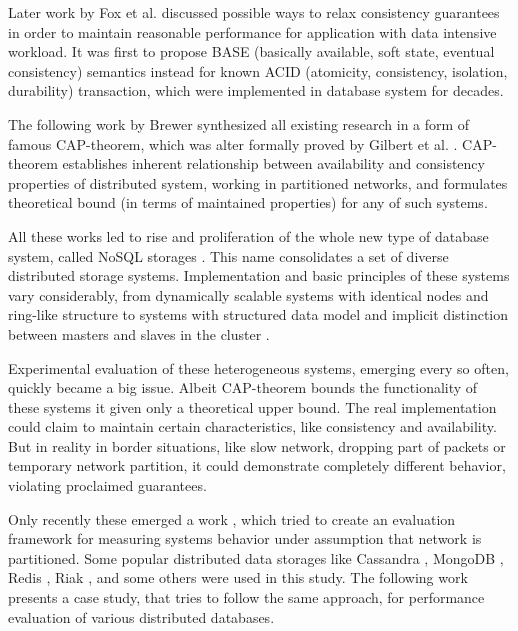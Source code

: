\documentclass[a4paper]{article}
\begin{document}
Later work by Fox et al. \cite{fox1997cluster} discussed possible ways to relax consistency guarantees in order to maintain reasonable performance for application with data intensive workload. 
It was first to propose BASE (basically available, soft state, eventual consistency) semantics instead for known ACID (atomicity, consistency, isolation, durability) transaction, which were implemented in database system for decades.

The following work by Brewer \cite{brewer2000towards} synthesized all existing research in a form of famous CAP-theorem, which was alter formally proved by Gilbert et al. \cite{gilbert2002brewer}.
CAP-theorem establishes inherent relationship between availability and consistency properties of distributed system, working in partitioned networks, and formulates theoretical bound (in terms of maintained properties) for any of such systems.

All these works led to rise and proliferation of the whole new type of database system, called NoSQL storages \cite{strauch2011nosql}.
This name consolidates a set of diverse distributed storage systems. 
Implementation and basic principles of these systems vary considerably, from dynamically scalable systems with identical nodes and ring-like structure \cite{decandia2007dynamo} to systems with structured data model and implicit distinction between masters and slaves in the cluster \cite{chang2008bigtable}.

Experimental evaluation of these heterogeneous systems, emerging every so often, quickly became a big issue.
Albeit CAP-theorem bounds the functionality of these systems it given only a theoretical upper bound.
The real implementation could claim to maintain certain characteristics, like consistency and availability.
But in reality in border situations, like slow network, dropping part of packets or temporary network partition, it could demonstrate completely different behavior, violating proclaimed guarantees.

Only recently these emerged a work \cite{jepsen}, which tried to create an evaluation framework for measuring systems behavior under assumption that network is partitioned.
Some popular distributed data storages like Cassandra \cite{lakshman2010cassandra}, MongoDB \cite{mongo}, Redis \cite{redis}, Riak \cite{riak}, and some others were used in this study.
The following work presents a case study, that tries to follow the same approach, for performance evaluation of various distributed databases.
\end{document}
